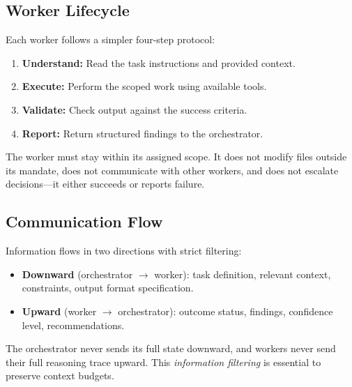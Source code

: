 \documentclass[11pt,letterpaper,twocolumn]{article}
\begin{document}
\subsection{Worker Lifecycle}

Each worker follows a simpler four-step protocol:

\begin{enumerate}[leftmargin=*,itemsep=1pt]
  \item \textbf{Understand:} Read the task instructions and provided
    context.
  \item \textbf{Execute:} Perform the scoped work using available tools.
  \item \textbf{Validate:} Check output against the success criteria.
  \item \textbf{Report:} Return structured findings to the orchestrator.
\end{enumerate}

The worker must stay within its assigned scope.  It does not modify files
outside its mandate, does not communicate with other workers, and does not
escalate decisions---it either succeeds or reports failure.

\subsection{Communication Flow}

Information flows in two directions with strict filtering:

\begin{itemize}[leftmargin=*,itemsep=1pt]
  \item \textbf{Downward} (orchestrator $\to$ worker): task definition,
    relevant context, constraints, output format specification.
  \item \textbf{Upward} (worker $\to$ orchestrator): outcome status,
    findings, confidence level, recommendations.
\end{itemize}

The orchestrator never sends its full state downward, and workers never send
their full reasoning trace upward.  This \emph{information filtering} is
essential to preserve context budgets.
\end{document}
